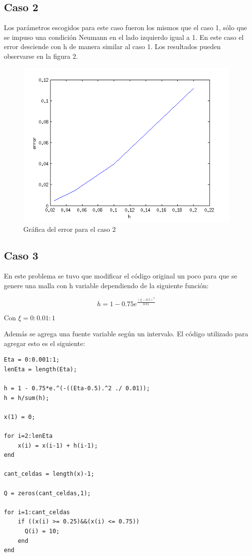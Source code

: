 \documentclass[11pt]{article}
\begin{document}
\subsection{Caso 2}

Los par\'ametros escogidos para este caso fueron los mismos que el caso 1, s\'olo que se impuso una condici\'on Neumann en el lado izquierdo igual a 1. En este caso el error desciende con h de manera similar al caso 1. Los resultados pueden observarse en la figura 2.

\begin{figure}[tbh]
	\centering
		\includegraphics[width=1.0\textwidth]{imagen2.png}
	\caption{Gr\'afica del error para el caso 2}
	\label{fig:Fig1}
\end{figure}

\bigskip 
\subsection{Caso 3}

En este problema se tuvo que modificar el c\'odigo original un poco para que se genere una malla con h variable dependiendo de la siguiente funci\'on:

\begin{equation}
h = 1 - 0.75e^{\frac{(\xi - 0.5)^2}{0.01}} 
\end{equation}

Con $\xi = 0:0.01:1$

\bigskip Adem\'as se agrega una fuente variable seg\'un un intervalo. El c\'odigo utilizado para agregar esto es el siguiente:

\bigskip
\lstset{language=Matlab, breaklines=true, basicstyle=\footnotesize}
\begin{lstlisting}[frame=single]
Eta = 0:0.001:1;
lenEta = length(Eta);

h = 1 - 0.75*e.^(-((Eta-0.5).^2 ./ 0.01));
h = h/sum(h);

x(1) = 0;

for i=2:lenEta
    x(i) = x(i-1) + h(i-1);
end

cant_celdas = length(x)-1;

Q = zeros(cant_celdas,1);

for i=1:cant_celdas
    if ((x(i) >= 0.25)&&(x(i) <= 0.75))
      Q(i) = 10;  
    end
end
\end{lstlisting}
\bigskip
\end{document}
